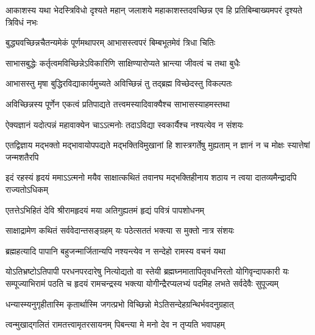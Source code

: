 \threelineshloka
{आकाशस्य यथा भेदस्त्रिविधो दृश्यते महान्}
{जलाशये महाकाशस्तदवच्छिन्न एव हि}
{प्रतिबिम्बाख्यमपरं दृश्यते त्रिविधं नभः} %

\twolineshloka
{बुद्ध्यवच्छिन्नचैतन्यमेकं पूर्णमथापरम्}
{आभासस्त्वपरं बिम्बभूतमेवं त्रिधा चितिः} %

\twolineshloka
{साभासबुद्धेः कर्तृत्वमविच्छिन्नेऽविकारिणि}
{साक्षिण्यारोप्यते भ्रान्त्या जीवत्वं च तथा बुधैः} %

\twolineshloka
{आभासस्तु मृषा बुद्धिरविद्याकार्यमुच्यते}
{अविच्छिन्नं तु तद्ब्रह्म विच्छेदस्तु विकल्पतः} %

\twolineshloka
{अविच्छिन्नस्य पूर्णेन एकत्वं प्रतिपाद्यते}
{तत्त्वमस्यादिवाक्यैश्च साभासस्याहमस्तथा} %

\twolineshloka
{ऐक्यज्ञानं यदोत्पन्नं महावाक्येन चाऽऽत्मनोः}
{तदाऽविद्या स्वकार्यैश्च नश्यत्येव न संशयः} %

\threelineshloka
{एतद्विज्ञाय मद्भक्तो मद्भावायोपपद्यते}
{मद्भक्तिविमुखानां हि शास्त्रगर्तेषु मुह्यताम्}
{न ज्ञानं न च मोक्षः स्यात्तेषां जन्मशतैरपि} %

\fourlineindentedshloka
{इदं रहस्यं हृदयं ममाऽऽत्मनो}
{मयैव साक्षात्कथितं तवानघ}
{मद्भक्तिहीनाय शठाय न त्वया}
{दातव्यमैन्द्रादपि राज्यतोऽधिकम्} %


\twolineshloka
{एतत्तेऽभिहितं देवि श्रीरामहृदयं मया}
{अतिगुह्यतमं हृद्यं पवित्रं पापशोधनम्} %

\twolineshloka
{साक्षाद्रामेण कथितं सर्ववेदान्तसङ्ग्रहम्}
{यः पठेत्सततं भक्त्या स मुक्तो नात्र संशयः} %

\twolineshloka
{ब्रह्महत्यादि पापानि बहुजन्मार्जितान्यपि}
{नश्यन्त्येव न सन्देहो रामस्य वचनं यथा} %

\fourlineindentedshloka
{योऽतिभ्रष्टोऽतिपापी परधनपरदारेषु नित्योद्यतो वा}
{स्तेयी ब्रह्मघ्नमातापितृवधनिरतो योगिवृन्दापकारी}
{यः सम्पूज्याभिरामं पठति च हृदयं रामचन्द्रस्य भक्त्या}
{योगीन्द्रैरप्यलभ्यं पदमिह लभते सर्वदेवैः सुपूज्यम्} %




\twolineshloka
{धन्यास्म्यनुगृहीतास्मि कृतार्थास्मि जगत्प्रभो}
{विच्छिन्नो मेऽतिसन्देहग्रन्थिर्भवदनुग्रहात्} %

\twolineshloka
{त्वन्मुखाद्गलितं रामतत्त्वामृतरसायनम्}
{पिबन्त्या मे मनो देव न तृप्यति भवापहम्} %

